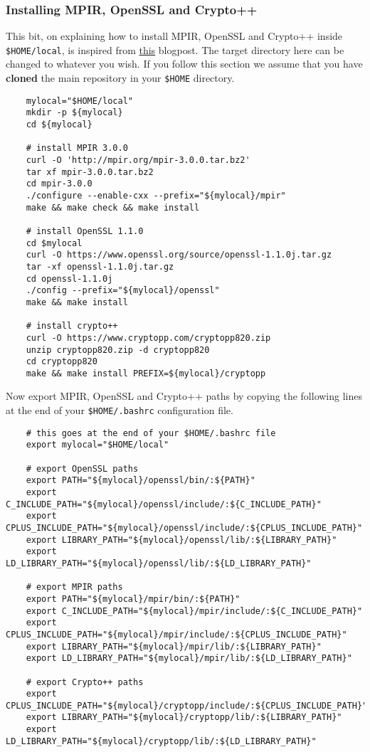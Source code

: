 \subsubsection{Installing MPIR, OpenSSL and Crypto++}
This bit, on explaining how to install  MPIR, OpenSSL and Crypto++ inside \verb+$HOME/local+,
is inspired from \href{https://rdragos.github.io/2019/01/07/scale/}{this} blogpost.
The target directory here can be changed to whatever you wish.
If you follow this section we assume that you have \textbf{cloned}
the main repository in your \verb+$HOME+ directory.
\begin{verbatim}
    mylocal="$HOME/local"
    mkdir -p ${mylocal}
    cd ${mylocal}

    # install MPIR 3.0.0
    curl -O 'http://mpir.org/mpir-3.0.0.tar.bz2'
    tar xf mpir-3.0.0.tar.bz2
    cd mpir-3.0.0
    ./configure --enable-cxx --prefix="${mylocal}/mpir"
    make && make check && make install

    # install OpenSSL 1.1.0
    cd $mylocal
    curl -O https://www.openssl.org/source/openssl-1.1.0j.tar.gz
    tar -xf openssl-1.1.0j.tar.gz
    cd openssl-1.1.0j
    ./config --prefix="${mylocal}/openssl"
    make && make install

    # install crypto++
    curl -O https://www.cryptopp.com/cryptopp820.zip
    unzip cryptopp820.zip -d cryptopp820
    cd cryptopp820
    make && make install PREFIX=${mylocal}/cryptopp
\end{verbatim}
Now export MPIR, OpenSSL and Crypto++ paths by copying the following
lines at the end of your \verb+$HOME/.bashrc+ configuration file.
\begin{verbatim}
    # this goes at the end of your $HOME/.bashrc file
    export mylocal="$HOME/local"

    # export OpenSSL paths
    export PATH="${mylocal}/openssl/bin/:${PATH}"
    export C_INCLUDE_PATH="${mylocal}/openssl/include/:${C_INCLUDE_PATH}"
    export CPLUS_INCLUDE_PATH="${mylocal}/openssl/include/:${CPLUS_INCLUDE_PATH}"
    export LIBRARY_PATH="${mylocal}/openssl/lib/:${LIBRARY_PATH}"
    export LD_LIBRARY_PATH="${mylocal}/openssl/lib/:${LD_LIBRARY_PATH}"

    # export MPIR paths
    export PATH="${mylocal}/mpir/bin/:${PATH}"
    export C_INCLUDE_PATH="${mylocal}/mpir/include/:${C_INCLUDE_PATH}"
    export CPLUS_INCLUDE_PATH="${mylocal}/mpir/include/:${CPLUS_INCLUDE_PATH}"
    export LIBRARY_PATH="${mylocal}/mpir/lib/:${LIBRARY_PATH}"
    export LD_LIBRARY_PATH="${mylocal}/mpir/lib/:${LD_LIBRARY_PATH}"

    # export Crypto++ paths
    export CPLUS_INCLUDE_PATH="${mylocal}/cryptopp/include/:${CPLUS_INCLUDE_PATH}"
    export LIBRARY_PATH="${mylocal}/cryptopp/lib/:${LIBRARY_PATH}"
    export LD_LIBRARY_PATH="${mylocal}/cryptopp/lib/:${LD_LIBRARY_PATH}"
\end{verbatim}

